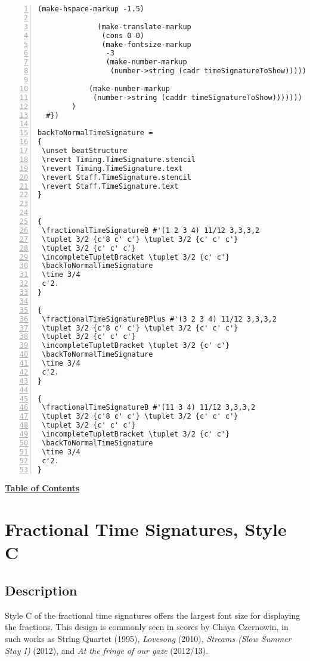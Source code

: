 \begin{Verbatim}[numbers=left,xleftmargin=5mm]
              (make-hspace-markup -1.5)

              (make-translate-markup
               (cons 0 0)
               (make-fontsize-markup
                -3
                (make-number-markup
                 (number->string (cadr timeSignatureToShow)))))))

            (make-number-markup
             (number->string (caddr timeSignatureToShow)))))))
        )
  #})

backToNormalTimeSignature =
{
 \unset beatStructure
 \revert Timing.TimeSignature.stencil
 \revert Timing.TimeSignature.text
 \revert Staff.TimeSignature.stencil
 \revert Staff.TimeSignature.text
}


{
 \fractionalTimeSignatureB #'(1 2 3 4) 11/12 3,3,3,2
 \tuplet 3/2 {c'8 c' c'} \tuplet 3/2 {c' c' c'}
 \tuplet 3/2 {c' c' c'}
 \incompleteTupletBracket \tuplet 3/2 {c' c'}
 \backToNormalTimeSignature
 \time 3/4
 c'2.
}

{
 \fractionalTimeSignatureBPlus #'(3 2 3 4) 11/12 3,3,3,2
 \tuplet 3/2 {c'8 c' c'} \tuplet 3/2 {c' c' c'}
 \tuplet 3/2 {c' c' c'}
 \incompleteTupletBracket \tuplet 3/2 {c' c'}
 \backToNormalTimeSignature
 \time 3/4
 c'2.
}

{
 \fractionalTimeSignatureB #'(11 3 4) 11/12 3,3,3,2
 \tuplet 3/2 {c'8 c' c'} \tuplet 3/2 {c' c' c'}
 \tuplet 3/2 {c' c' c'}
 \incompleteTupletBracket \tuplet 3/2 {c' c'}
 \backToNormalTimeSignature
 \time 3/4
 c'2.
}
\end{Verbatim}

\hyperref[sec:toc]{\textbf{Table of Contents}}

\vfill \break




\section {Fractional Time Signatures, Style C}

\hfill
{}
\hfill

\subsection{Description}
Style C of the fractional time signatures offers the largest font size for displaying the fractions. This design is commonly seen in scores by Chaya Czernowin, in such works as String Quartet (1995),\autocite{RN1749}  \textit{Lovesong} (2010),\autocite{RN1751} \textit{Streams (Slow Summer Stay I)} (2012),\autocite{RN1750}  and \textit{At the fringe of our gaze} (2012/13).\autocite{RN1752}  

